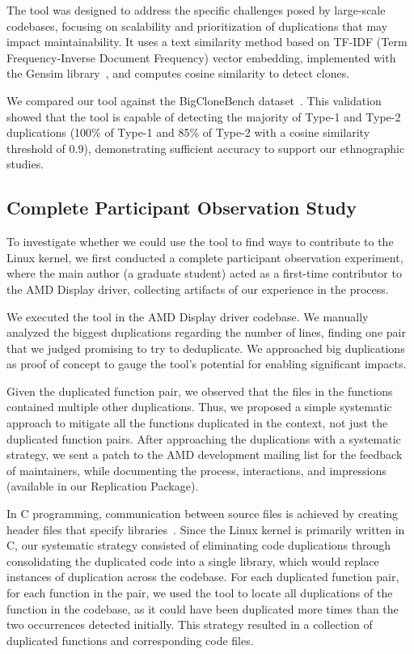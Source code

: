\documentclass[10pt,conference]{IEEEtran}
\begin{document}
The tool was designed to address the specific challenges posed by large-scale codebases, focusing on scalability and prioritization of duplications that may impact maintainability. It uses a text similarity method based on TF-IDF (Term Frequency-Inverse Document Frequency) vector embedding, implemented with the Gensim library~\cite{gensim}, and computes cosine similarity to detect clones.

We compared our tool against the BigCloneBench dataset~\cite{bigclonebench}. This validation showed that the tool is capable of detecting the majority of Type-1 and Type-2 duplications (100\% of Type-1 and 85\% of Type-2 with a cosine similarity threshold of 0.9), demonstrating sufficient accuracy to support our ethnographic studies.

\subsection{Complete Participant Observation Study}
\label{sec:participant}

To investigate whether we could use the tool to find ways to contribute to the Linux kernel, we first conducted a complete participant observation experiment, where the main author (a graduate student) acted as a first-time contributor to the AMD Display driver, collecting artifacts of our experience in the process.

We executed the tool in the AMD Display driver codebase. We manually analyzed the biggest duplications regarding the number of lines, finding one pair that we judged promising to try to deduplicate. We approached big duplications as proof of concept to gauge the tool's potential for enabling significant impacts.

Given the duplicated function pair, we observed that the files in the functions contained multiple other duplications. Thus, we proposed a simple systematic approach to mitigate all the functions duplicated in the context, not just the duplicated function pairs. After approaching the duplications with a systematic strategy, we sent a patch to the AMD development mailing list for the feedback of maintainers, while documenting the process, interactions, and impressions (available in our Replication Package).

In C programming, communication between source files is achieved by creating header files that specify libraries~\cite{Cbook}. Since the Linux kernel is primarily written in C, our systematic strategy consisted of eliminating code duplications through consolidating the duplicated code into a single library, which would replace instances of duplication across the codebase. For each duplicated function pair, for each function in the pair, we used the tool to locate all duplications of the function in the codebase, as it could have been duplicated more times than the two occurrences detected initially. This strategy resulted in a collection of duplicated functions and corresponding code files.
\end{document}
